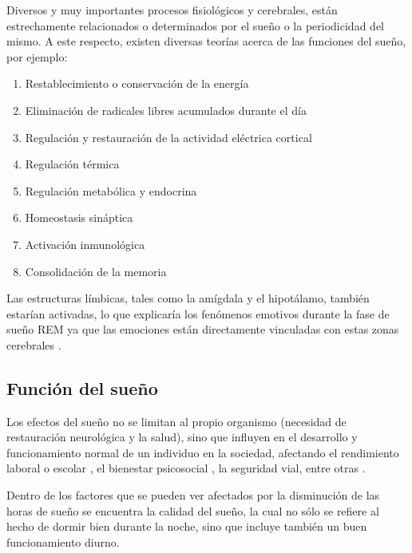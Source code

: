 \documentclass[12pt,a4paper]{mitthesis}
\begin{document}
Diversos y muy importantes procesos fisiol\'ogicos y cerebrales, est\'an estrechamente 
relacionados o determinados por el sue\~no o la periodicidad del mismo. A este respecto, existen 
diversas teor\'ias acerca de las funciones del sue\~no, por ejemplo: 
\begin{enumerate}
\item Restablecimiento o conservaci\'on de la energ\'ia
\item Eliminaci\'on de radicales libres acumulados durante el d\'ia
\item Regulaci\'on y restauraci\'on de la actividad el\'ectrica cortical
\item Regulación t\'ermica
\item Regulación metabólica y endocrina
\item Homeostasis sin\'aptica
\item Activaci\'on inmunol\'ogica
\item Consolidaci\'on de la memoria
\end{enumerate}

Las estructuras l\'imbicas, tales como la am\'igdala y el hipot\'alamo, tambi\'en estar\'ian 
activadas, lo que explicar\'ia los fen\'omenos emotivos durante la fase de sue\~no REM ya que 
las emociones est\'an directamente vinculadas con estas zonas cerebrales \cite{Bonet08}.


\subsection{Funci\'on del sue\~no}

Los efectos del sue\~no no se limitan al propio organismo (necesidad de restauración neurol\'ogica
y la salud), sino que influyen en el desarrollo y funcionamiento normal de un individuo en la 
sociedad, afectando el rendimiento laboral o escolar \cite{Sierra02,Baez05,Rosales06,Marin08}, 
el bienestar psicosocial \cite{BuelaCasal04,Vassali09,Gibson06}, la seguridad vial, entre 
otras \cite{Fontana14}.

Dentro de los factores que se pueden ver afectados por la disminuci\'on de las horas de sue\~no 
se encuentra la calidad del sue\~no, la cual no s\'olo se refiere al hecho de dormir bien durante 
la noche, sino que incluye también un buen funcionamiento diurno. 

\end{document}

